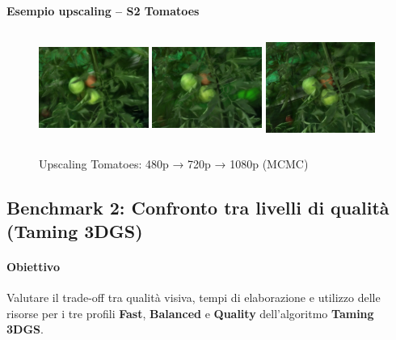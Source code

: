 \paragraph{Esempio upscaling -- S2 Tomatoes}
\begin{figure}[H]
	\centering
	\includegraphics[width=0.32\textwidth,height=3.5cm,trim={80 40 80 40},clip]{images/benchmarks/tomatoes_480_mcmc.jpg}
	\includegraphics[width=0.32\textwidth,height=3.5cm,trim={80 40 80 40},clip]{images/benchmarks/tomatoes_720_mcmc.jpg}
	\includegraphics[width=0.32\textwidth,height=3.5cm,trim={80 40 80 40},clip]{images/benchmarks/tomatoes_1080_mcmc.jpg}
	\caption{Upscaling Tomatoes: 480p → 720p → 1080p (MCMC)}
	\label{fig:tomatoes_resolution_comparison}
\end{figure}


\newpage
\subsection{Benchmark 2: Confronto tra livelli di qualit\`a (Taming 3DGS)}
\label{subsec:benchmark2_quality_levels}

\paragraph{Obiettivo}
Valutare il trade-off tra qualit\`a visiva, tempi di elaborazione e utilizzo delle risorse
per i tre profili \textbf{Fast}, \textbf{Balanced} e \textbf{Quality} dell'algoritmo \textbf{Taming 3DGS}.

